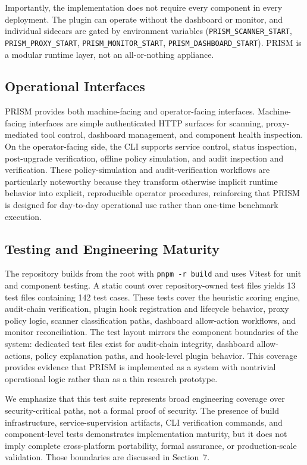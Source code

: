Importantly, the implementation does not require every component in every deployment. The plugin can operate without the dashboard or monitor, and individual sidecars are gated by environment variables (\texttt{PRISM\_SCANNER\_START}, \texttt{PRISM\_PROXY\_START}, \texttt{PRISM\_MONITOR\_START}, \texttt{PRISM\_DASHBOARD\_START}). PRISM is a modular runtime layer, not an all-or-nothing appliance.

\subsection{Operational Interfaces}

PRISM provides both machine-facing and operator-facing interfaces. Machine-facing interfaces are simple authenticated HTTP surfaces for scanning, proxy-mediated tool control, dashboard management, and component health inspection. On the operator-facing side, the CLI supports service control, status inspection, post-upgrade verification, offline policy simulation, and audit inspection and verification. These policy-simulation and audit-verification workflows are particularly noteworthy because they transform otherwise implicit runtime behavior into explicit, reproducible operator procedures, reinforcing that PRISM is designed for day-to-day operational use rather than one-time benchmark execution.

\subsection{Testing and Engineering Maturity}

The repository builds from the root with \texttt{pnpm -r build} and uses Vitest for unit and component testing. A static count over repository-owned test files yields 13 test files containing 142 test cases. These tests cover the heuristic scoring engine, audit-chain verification, plugin hook registration and lifecycle behavior, proxy policy logic, scanner classification paths, dashboard allow-action workflows, and monitor reconciliation. The test layout mirrors the component boundaries of the system: dedicated test files exist for audit-chain integrity, dashboard allow-actions, policy explanation paths, and hook-level plugin behavior. This coverage provides evidence that PRISM is implemented as a system with nontrivial operational logic rather than as a thin research prototype.

We emphasize that this test suite represents broad engineering coverage over security-critical paths, not a formal proof of security. The presence of build infrastructure, service-supervision artifacts, CLI verification commands, and component-level tests demonstrates implementation maturity, but it does not imply complete cross-platform portability, formal assurance, or production-scale validation. Those boundaries are discussed in Section~7.
